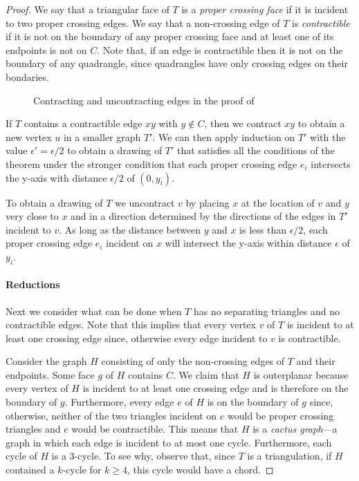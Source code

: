 \documentclass{patmorin}
\begin{document}
\begin{proof}
  



   We say that a triangular face of $T$ is a \emph{proper crossing
   face} if it is incident to two proper crossing edges.  We say that
   a non-crossing edge of $T$ is \emph{contractible} if it is not on
   the boundary of any proper crossing face and at least one of its
   endpoints is not on $C$. Note that, if an edge is contractible then
   it is not on the boundary of any quadrangle, since quadrangles have
   only crossing edges on their bondaries.

   \begin{figure}
      \caption{Contracting and uncontracting edges in the proof of
      }
   \end{figure}

   If $T$ contains a contractible edge $xy$ with $y\not\in C$,
   then we contract $xy$ to obtain a new vertex $u$ in a smaller
   graph $T'$.   We can then apply induction on $T'$ with the
   value $\epsilon'=\epsilon/2$ to obtain a drawing of $T'$ that satisfies
   all the conditions of the theorem under the stronger condition that
   each proper crossing edge $e_i$ intersects the y-axis with distance
   $\epsilon/2$ of $(0,y_i)$.

   To obtain a drawing of $T$ we uncontract $v$ by placing $x$ at
   the location of $v$ and $y$ very close to $x$ and in a direction
   determined by the directions of the edges in $T'$ incident to $v$.
   As long as the distance between $y$ and $x$ is less than $\epsilon/2$,
   each proper crossing edge $e_i$ incident on $x$ will intersect the
   y-axis within distance $\epsilon$ of $y_i$.

   \paragraph{Reductions}
   Next we consider what can be done when $T$ has no separating
   triangles and no contractible edges.  Note that this implies that
   every vertex $v$ of $T$ is incident to at least one crossing edge
   since, otherwise every edge incident to $v$ is contractible.
  
   Consider the graph $H$ consisting of only the non-crossing edges of $T$
   and their endpoints.  Some face $g$ of $H$ contains $C$.  We claim
   that $H$ is outerplanar because every vertex of $H$ is incident to
   at least one crossing edge and is therefore on the boundary of $g$.
   Furthermore, every edge $e$ of $H$ is on the boundary of $g$ since,
   otherwise, neither of the two triangles incident on $e$ would be proper
   crossing triangles and $e$ would be contractible.  This means that
   $H$ is a \emph{cactus graph}---a graph in which each edge is incident
   to at most one cycle.  Furthermore, each cycle of $H$ is a 3-cycle.
   To see why, observe that, since $T$ is a triangulation, if $H$
   contained a $k$-cycle for $k\ge 4$, this cycle would have a chord.


\end{proof}
\end{document}
